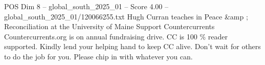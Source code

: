 \begin{textsample}{POS Dim 8 – global\_south\_2025\_01 – Score 4.00 – global\_south\_2025\_01/120066255.txt}
Hugh Curran teaches in Peace \&amp ; Reconciliation at the University of Maine Support Countercurrents Countercurrents.org is on annual fundraising drive.
CC is 100 \% reader supported.
Kindly lend your helping hand to keep CC alive.
Don't wait for others to do the job for you.
Please chip in with whatever you can.

\end{textsample}
